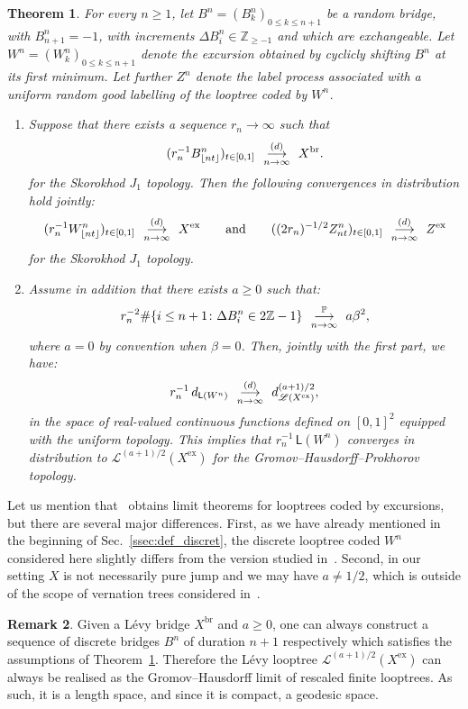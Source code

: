 \documentclass[british, a4paper,11pt]{article}
\numberwithin{equation}{section}
\newtheorem{thm}{\bfseries \upshape Theorem}[section]
\theoremstyle{definition}
\newtheorem{rem}[thm]{Remark}
\renewcommand{\P}{\mathop{}\!\mathbb{P}}
\newcommand{\Z}{\mathbb{Z}}
\newcommand{\Loop}{\mathscr{L}}
\newcommand{\Loopd}{\mathsf{L}}
\newcommand{\cvloi}[1][n]{\enskip\mathop{\longrightarrow}^{(d)}_{#1 \to \infty}\enskip}
\newcommand{\cvproba}[1][n]{\enskip\mathop{\longrightarrow}^{\P}_{#1 \to \infty}\enskip}
\newcommand{\exc}{\mathrm{ex}}
\newcommand{\br}{\mathrm{br}}
\begin{document}
\begin{thm}\label{thm:convergence_looptrees_labels_Levy}
For every $n \geq 1$, let $B^{n} = (B^{n}_{k})_{0\leq k \leq n+1}$ be a random bridge, with $B^{n}_{n+1}=-1$, with increments $\Delta B^{n}_i \in \Z_{\ge-1}$ and which are exchangeable. 
Let $W^{n} = (W^{n}_{k})_{0\leq k \leq n+1}$ denote the excursion obtained by cyclicly shifting $B^{n}$ at its first minimum. Let further $Z^n$ denote the label process associated with a uniform random good labelling of the looptree coded by $W^n$.
\begin{enumerate}
\item Suppose that there exists a sequence $r_{n} \to \infty$ such that
\[(r_{n}^{-1} B^{n}_{\lfloor nt\rfloor})_{t \in [0,1]} \cvloi X^{\br}.\]
for the Skorokhod $J_{1}$ topology.
Then the following convergences in distribution hold jointly:
\[
(r_{n}^{-1} W^{n}_{\lfloor nt\rfloor})_{t \in [0,1]} \cvloi X^{\exc}
\qquad\text{and}\qquad
((2 r_n)^{-1/2} Z^n_{n t})_{t \in [0,1]} \cvloi Z^{\exc}
\]
for the Skorokhod $J_{1}$ topology.

\item Assume in addition that there exists $a \ge 0$ such that:
\begin{equation}\label{eq:cvhyp2}
r_n^{-2} \#\{i \leq n+1 \colon \Delta B^n_i \in 2\Z-1\} \cvproba a \beta^2,
\end{equation}
where $a=0$ by convention when $\beta=0$.
Then, jointly with the first part, we have:
\[r_{n}^{-1}\, d_{\Loopd(W^{n})} \cvloi d^{(a+1)/2}_{\Loop(X^{\exc})},\]
in the space of real-valued continuous functions defined on $[0,1]^2$ equipped with the uniform topology.
This implies that $r_{n}^{-1}\,\Loopd(W^{n})$ converges in distribution to $\Loop^{(a+1)/2}(X^{\exc})$ for the Gromov--Hausdorff--Prokhorov topology.
\end{enumerate}
\end{thm}


Let us mention that~\cite[Section 6.3]{Kha22} obtains limit theorems for looptrees coded by excursions, but there are several major differences. First, as we have already mentioned in the beginning of Sec.~\ref{ssec:def_discret}, 
the discrete looptree coded $W^{n}$ considered here slightly differs from the version studied in~\cite{Kha22}.
Second, in our setting $X$ is not necessarily pure jump and we may have $a \neq 1/2$, which is outside of the scope of vernation trees considered in~\cite{Kha22}.


\begin{rem}\label{rem:geodesic_space}
Given a L\'evy bridge $X^{\br}$ and $a \ge 0$, one can always construct a sequence of discrete bridges $B^n$ of duration $n+1$ respectively which satisfies the assumptions of Theorem~\ref{thm:convergence_looptrees_labels_Levy}.
Therefore the L\'evy looptree $\Loop^{(a+1)/2}(X^{\exc})$ can always be realised as the Gromov--Hausdorff limit of rescaled finite looptrees. As such, it is a length space, and since it is compact, a geodesic space.
\end{rem}
\end{document}
